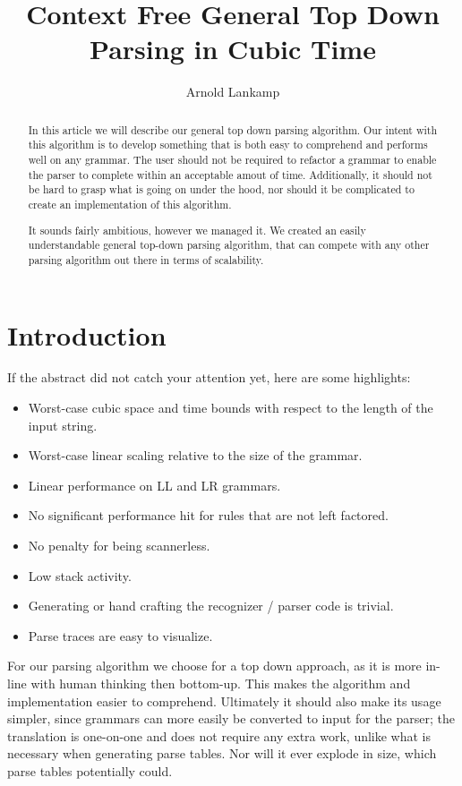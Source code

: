 \documentclass[a4paper,10pt]{article}
\title{Context Free General Top Down Parsing in Cubic Time}
\author{Arnold Lankamp}
\begin{document}
\maketitle

\begin{abstract}

In this article we will describe our general top down parsing algorithm. Our intent with this algorithm is to develop something that is both easy to comprehend and performs well on any grammar. The user should not be required to refactor a grammar to enable the parser to complete within an acceptable amout of time. Additionally, it should not be hard to grasp what is going on under the hood, nor should it be complicated to create an implementation of this algorithm.

It sounds fairly ambitious, however we managed it. We created an easily understandable general top-down parsing algorithm, that can compete with any other parsing algorithm out there in terms of scalability.

\end{abstract}

\section{Introduction}

If the abstract did not catch your attention yet, here are some highlights:
\begin{itemize}
 \setlength{\itemsep}{0pt}
 \setlength{\parskip}{0pt}
 \setlength{\parsep}{0pt}
 
 \item Worst-case cubic space and time bounds with respect to the length of the input string.
 \item Worst-case linear scaling relative to the size of the grammar.
 \item Linear performance on LL and LR grammars.
 \item No significant performance hit for rules that are not left factored.
 \item No penalty for being scannerless.
 \item Low stack activity.
 \item Generating or hand crafting the recognizer / parser code is trivial.
 \item Parse traces are easy to visualize.
\end{itemize}

For our parsing algorithm we choose for a top down approach, as it is more in-line with human thinking then bottom-up. This makes the algorithm and implementation easier to comprehend. Ultimately it should also make its usage simpler, since grammars can more easily be converted to input for the parser; the translation is one-on-one and does not require any extra work, unlike what is necessary when generating parse tables. Nor will it ever explode in size, which parse tables potentially could.
\end{document}
